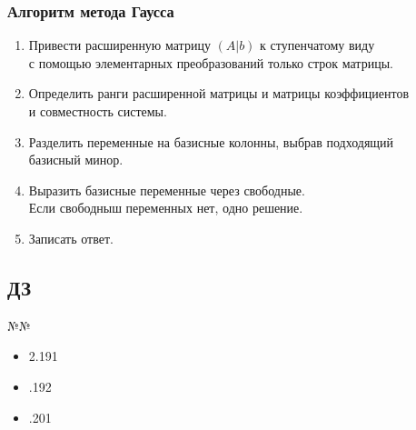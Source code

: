 \documentclass{article}
\begin{document}
\subsubsection{Алгоритм метода Гаусса}

\begin{enumerate}
	\item Привести расширенную матрицу $(A | b)$ к ступенчатому виду \\
	с помощью элементарных преобразований только строк матрицы.
	\item Определить ранги расширенной матрицы и матрицы коэффициентов \\
	и совместность системы.
	\item Разделить переменные на базисные колонны, выбрав подходящий \\
	базисный минор.
	\item Выразить базисные переменные через свободные. \\
	Если свободныш переменных нет, одно решение.
	\item Записать ответ.
\end{enumerate}

\subsection{ДЗ}

№№
\begin{itemize}
	\item 2.191
	\item .192
	\item .201
\end{itemize}
\end{document}
